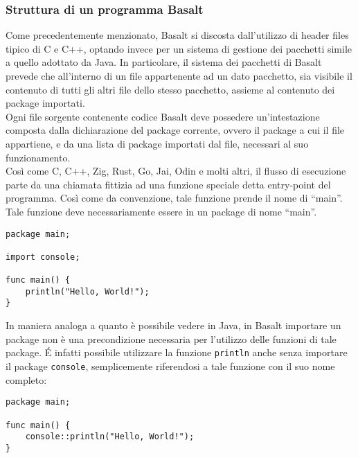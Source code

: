 \subsubsection{Struttura di un programma Basalt}
Come precedentemente menzionato, Basalt si discosta dall'utilizzo di header files tipico di C e C++, optando invece per un sistema di gestione dei pacchetti simile a quello adottato da Java. In particolare, 
il sistema dei pacchetti di Basalt prevede che all’interno di un file appartenente ad un dato pacchetto, sia visibile il contenuto di tutti gli altri file dello stesso pacchetto, assieme al contenuto 
dei package importati. \\

Ogni file sorgente contenente codice Basalt deve possedere un'intestazione composta dalla dichiarazione del package corrente, ovvero il package a cui il file appartiene, e 
da una lista di package importati dal file, necessari al suo funzionamento. \\
 
Così come C, C++, Zig, Rust, Go, Jai, Odin e molti altri, il flusso di esecuzione parte da una chiamata fittizia ad una funzione speciale detta entry-point del programma. Così 
come da convenzione, tale funzione prende il nome di “main”. Tale funzione deve necessariamente essere in un package di nome “main”. \\


\begin{lstlisting}[frame=single]
package main;

import console;

func main() {
    println("Hello, World!");
}
\end{lstlisting}

\vspace{0.5cm}

In maniera analoga a quanto è possibile vedere in Java, in Basalt importare un package non 
è una precondizione necessaria per l'utilizzo delle funzioni di tale package. É infatti possibile
utilizzare la funzione \texttt{println} anche senza importare il package \texttt{console}, semplicemente riferendosi
a tale funzione con il suo nome completo: \\

\begin{lstlisting}[frame=single]
package main;

func main() {
    console::println("Hello, World!");
}
\end{lstlisting}
    